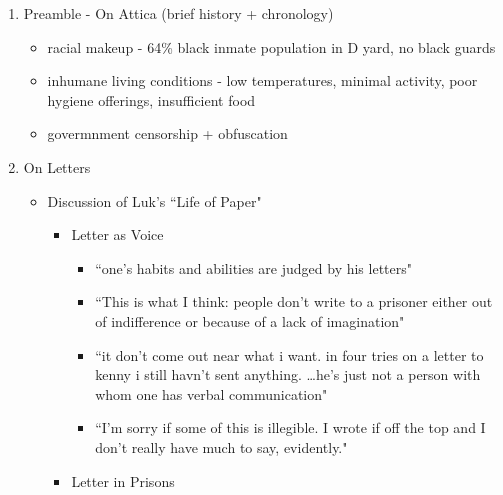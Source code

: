 \documentclass[14pt, letterpaper]{report}
\begin{document}
	\begin{enumerate}

		\item Preamble - On Attica (brief history + chronology)
		\begin{itemize}
			\item   racial makeup - 64\% black inmate population in D yard,\autocite[490]{attica-report}
				no black guards \autocite[147]{letters-from-attica}

			\item   inhumane living conditions - low temperatures, minimal activity, poor 
				hygiene offerings, insufficient food\autocite{blood-in-water}
			
			\item   govermnment censorship + obfuscation\autocite[573]{blood-in-water}
		\end{itemize}
	
		\item On Letters
		\begin{itemize}
		
			\item Discussion of Luk's ``Life of Paper"
			\begin{itemize}
				
				\item Letter as Voice
				\begin{itemize}
					
					\item ``one's habits and abilities are judged 
						by his letters"\autocite[2]{life-of-paper}

					\item ``This is what I think: people don't write to
						a prisoner either out of indifference or because
						of a lack of imagination"\autocite[6]{life-of-paper}

					\item ``it don't come out near what i want.
						in four tries on a letter to kenny i still havn't sent 
						anything. \ldots he's just not a person with whom one 
						has verbal communication"\autocite[87]{letters-from-attica}

					\item ``I'm sorry if some of this is illegible. I wrote if off the top 
						and I don't really have much to say, evidently."\autocite[144]{letters-from-attica}			
					
				\end{itemize}

				\item Letter in Prisons
				\begin{itemize}
		

\end{itemize}
\end{itemize}
\end{itemize}
\end{enumerate}
\end{document}
